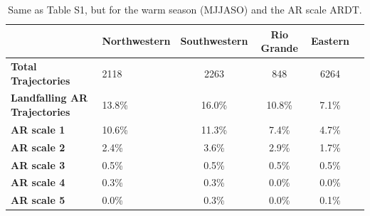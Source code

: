 \documentclass[jgrga]{agutexSI2019}
\begin{document}
\begin{article}
\begin{table}
\caption{ Same as Table S1, but for the warm season (MJJASO) and the AR scale ARDT.}
\label{table:MJJASOar_scale}
\begin{tabular}{lp{2cm}cccc}
\toprule
 & Northwestern & Southwestern & Rio Grande & Eastern \\
\midrule
\textbf{Total Trajectories} & 2118 & 2263 & 848 & 6264 \\
\textbf{Landfalling AR Trajectories} & 13.8\% & 16.0\% & 10.8\% & 7.1\% \\
\textbf{AR scale 1} & 10.6\% & 11.3\% & 7.4\% & 4.7\% \\
\textbf{AR scale 2} & 2.4\% & 3.6\% & 2.9\% & 1.7\% \\
\textbf{AR scale 3} & 0.5\% & 0.5\% & 0.5\% & 0.5\% \\
\textbf{AR scale 4} & 0.3\% & 0.3\% & 0.0\% & 0.0\% \\
\textbf{AR scale 5} & 0.0\% & 0.3\% & 0.0\% & 0.1\% \\
\bottomrule
\end{tabular}
\end{table}





%







\end{article}
\end{document}
